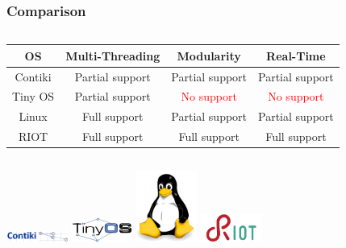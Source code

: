 \documentclass{beamer}
\begin{document}
\begin{frame}
	\frametitle{Comparison}
	\begin{columns}[c]
		\begin{column}{30cm}
			\hspace{0.9cm}
			\begin{tabular}{| c | c | c | c |}
				\hline
				OS & Multi-Threading & Modularity & Real-Time \\ \hline
				Contiki & \textcolor{TextOrange}{Partial support} &
				\textcolor{TextOrange}{Partial support} &
				\textcolor{TextOrange}{Partial support} \\ \hline
				Tiny OS & \textcolor{TextOrange}{Partial support} &
				\textcolor{red}{No support} &
				\textcolor{red}{No support} \\ \hline
				Linux & \textcolor{TextGreen}{Full support} &
				\textcolor{TextOrange}{Partial support} &
				\textcolor{TextOrange}{Partial support} \\ \hline
				RIOT & \textcolor{TextGreen}{Full support} &
				\textcolor{TextGreen}{Full support} &
				\textcolor{TextGreen}{Full support} \\ \hline
			\end{tabular}
		\end{column}
	\end{columns}
	\vspace{.5cm}
	\hspace*{1cm}
	\includegraphics[width=2cm]{figs/contiki-logo.png}
	\hspace*{.5cm}
	\includegraphics[width=2cm]{figs/tinyos-logo.jpg}
	\hspace*{.5cm}
	\includegraphics[width=2cm]{figs/linux-logo.jpeg}
	\hspace*{.5cm}
	\includegraphics[width=2cm]{figs/riot-logo.png}
\end{frame}
\end{document}
